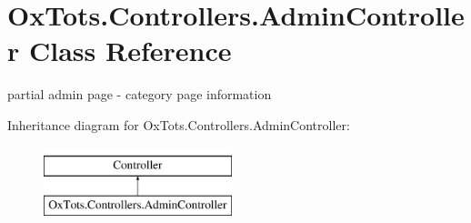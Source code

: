 \hypertarget{class_ox_tots_1_1_controllers_1_1_admin_controller}{}\section{Ox\+Tots.\+Controllers.\+Admin\+Controller Class Reference}
\label{class_ox_tots_1_1_controllers_1_1_admin_controller}


partial admin page -\/ category page information  


Inheritance diagram for Ox\+Tots.\+Controllers.\+Admin\+Controller\+:\begin{figure}[H]
\begin{center}
\leavevmode
\includegraphics[height=2.000000cm]{class_ox_tots_1_1_controllers_1_1_admin_controller}
\end{center}
\end{figure}
